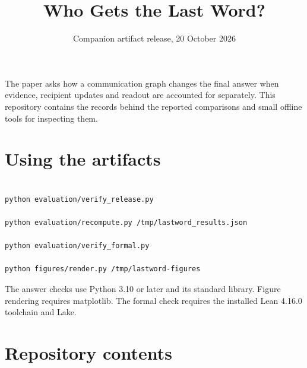 \documentclass[11pt]{article}
\title{Who Gets the Last Word?}
\author{}
\date{Companion artifact release, 20 October 2026}
\begin{document}
\maketitle

The paper asks how a communication graph changes the final answer when evidence, recipient updates and readout are accounted for separately. This repository contains the records behind the reported comparisons and small offline tools for inspecting them.

\section*{Using the artifacts}

\begin{verbatim}

python evaluation/verify_release.py

python evaluation/recompute.py /tmp/lastword_results.json

python evaluation/verify_formal.py

python figures/render.py /tmp/lastword-figures

\end{verbatim}

The answer checks use Python 3.10 or later and its standard library. Figure rendering requires matplotlib. The formal check requires the installed Lean 4.16.0 toolchain and Lake.

\section*{Repository contents}
\end{document}
